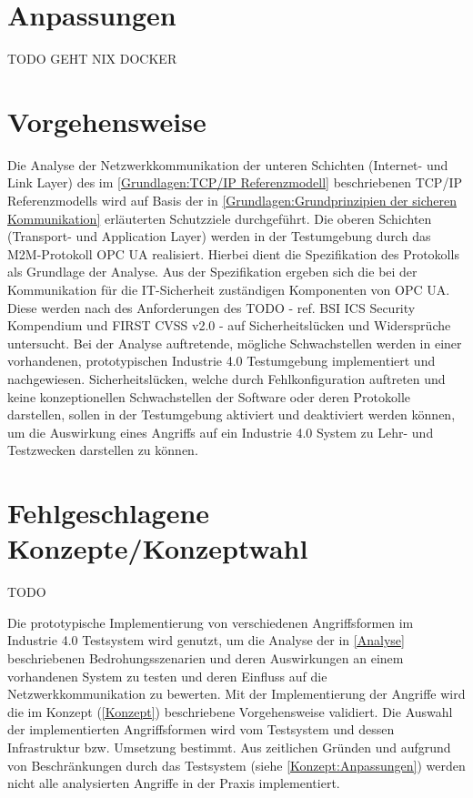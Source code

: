 \section{Anpassungen}
\label{Konzept:Anpassungen}
TODO GEHT NIX DOCKER

\section{Vorgehensweise}
Die Analyse der Netzwerkkommunikation der unteren Schichten (Internet- und Link Layer) des im \autoref{Grundlagen:TCP/IP Referenzmodell} beschriebenen TCP/IP Referenzmodells wird auf Basis der in \autoref{Grundlagen:Grundprinzipien der sicheren Kommunikation} erläuterten Schutzziele durchgeführt. Die oberen Schichten (Transport- und Application Layer) werden in der Testumgebung durch das \ac{M2M}-Protokoll \ac{OPC UA} realisiert. Hierbei dient die Spezifikation des Protokolls als Grundlage der Analyse. Aus der Spezifikation ergeben sich die bei der Kommunikation für die IT-Sicherheit zuständigen Komponenten von \ac{OPC UA}. Diese werden nach des Anforderungen des TODO - ref. BSI ICS Security Kompendium und FIRST CVSS v2.0 - auf Sicherheitslücken und Widersprüche untersucht. Bei der Analyse auftretende, mögliche Schwachstellen werden in einer vorhandenen, prototypischen Industrie 4.0 Testumgebung \cite{Weber2018} implementiert und nachgewiesen. Sicherheitslücken, welche durch Fehlkonfiguration auftreten und keine konzeptionellen Schwachstellen der Software oder deren Protokolle darstellen, sollen in der Testumgebung aktiviert und deaktiviert werden können, um die Auswirkung eines Angriffs auf ein Industrie 4.0 System zu Lehr- und Testzwecken darstellen zu können.

\section{Fehlgeschlagene Konzepte/Konzeptwahl}
TODO

Die prototypische Implementierung von verschiedenen Angriffsformen im Industrie 4.0 Testsystem wird genutzt, um die Analyse der in \autoref{Analyse} beschriebenen Bedrohungsszenarien und deren Auswirkungen an einem vorhandenen System zu testen und deren Einfluss auf die Netzwerkkommunikation zu bewerten. Mit der Implementierung der Angriffe wird die im Konzept (\autoref{Konzept}) beschriebene Vorgehensweise validiert. Die Auswahl der implementierten Angriffsformen wird vom Testsystem und dessen Infrastruktur bzw. Umsetzung bestimmt. Aus zeitlichen Gründen und aufgrund von Beschränkungen durch das Testsystem (siehe \autoref{Konzept:Anpassungen}) werden nicht alle analysierten Angriffe in der Praxis implementiert.

